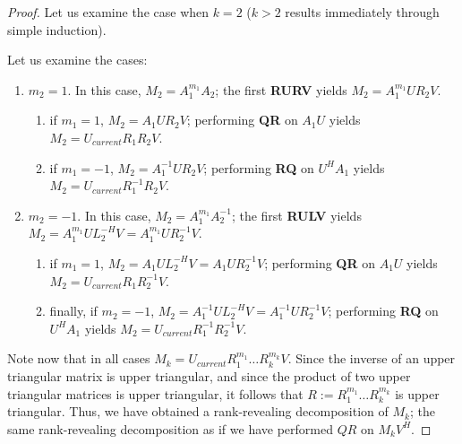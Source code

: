 \documentclass{article}
\theoremstyle{definition}
\begin{document}
\begin{proof} Let us examine the case when $k = 2$ ($k>2$ results immediately through simple induction). 

Let us examine the cases:
\begin{enumerate}
\item $m_2 = 1$. In this case, $M_2 = A_1^{m_1} A_2$; the first \textbf{RURV} yields
$M_2 = A_1^{m_1} UR_2V$. \begin{enumerate}
\item if $m_1 = 1$, $M_2 = A_1 UR_2V$; performing \textbf{QR} on $A_1 U$ yields
$M_2= U_{current} R_1 R_2 V$.
\item if $m_1 = -1$, $M_2 = A_1^{-1} UR_2V$; performing \textbf{RQ} on $U^{H}A_1$ yields $M_2 = U_{current} R_1^{-1} R_2 V$.
\end{enumerate}
\item $m_2 = -1$. In this case, $M_2 = A_1^{m_1} A_2^{-1}$; the first \textbf{RULV} yields $M_2 = A_1^{m_1} U L_2^{-H} V = A_1^{m_1} U R_2^{-1} V$. \begin{enumerate}
\item if $m_1 = 1$, $M_2 = A_1 U L_2^{-H} V = A_1 U R_2^{-1} V$; performing \textbf{QR} on $A_1 U$ yields $M_2 = U_{current} R_1 R_2^{-1} V$.
\item finally, if $m_2 = -1$,  $M_2 = A_1^{-1} U L_2^{-H} V = A_1^{-1} U R_2^{-1}V$; performing \textbf{RQ} on $U^{H}A_1$ yields $M_2 = U_{current} R_1^{-1} R_2^{-1} V$.
\end{enumerate}
\end{enumerate}

Note now that in all cases $M_k = U_{current} R_1^{m_1} \ldots R_k^{m_k} V$. Since the inverse of an upper triangular matrix is upper triangular, and since the product of two upper triangular matrices is upper triangular, it follows that $R:=R_1^{m_1} \ldots R_k^{m_k}$ is upper triangular. Thus, we have obtained a rank-revealing decomposition of $M_k$; the same rank-revealing decomposition as if we have performed $QR$ on $M_k V^{H}$.
\end{proof}
\end{document}
